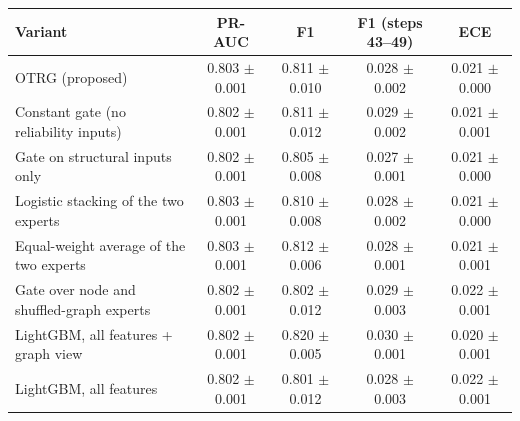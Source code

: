 \begin{tabular}{lcccc}
\toprule
Variant & PR-AUC & F1 & F1 (steps 43--49) & ECE \\
\midrule
OTRG (proposed) & 0.803 $\pm$ 0.001 & 0.811 $\pm$ 0.010 & 0.028 $\pm$ 0.002 & 0.021 $\pm$ 0.000 \\
Constant gate (no reliability inputs) & 0.802 $\pm$ 0.001 & 0.811 $\pm$ 0.012 & 0.029 $\pm$ 0.002 & 0.021 $\pm$ 0.001 \\
Gate on structural inputs only & 0.802 $\pm$ 0.001 & 0.805 $\pm$ 0.008 & 0.027 $\pm$ 0.001 & 0.021 $\pm$ 0.000 \\
Logistic stacking of the two experts & 0.803 $\pm$ 0.001 & 0.810 $\pm$ 0.008 & 0.028 $\pm$ 0.002 & 0.021 $\pm$ 0.000 \\
Equal-weight average of the two experts & 0.803 $\pm$ 0.001 & 0.812 $\pm$ 0.006 & 0.028 $\pm$ 0.001 & 0.021 $\pm$ 0.001 \\
Gate over node and shuffled-graph experts & 0.802 $\pm$ 0.001 & 0.802 $\pm$ 0.012 & 0.029 $\pm$ 0.003 & 0.022 $\pm$ 0.001 \\
LightGBM, all features + graph view & 0.802 $\pm$ 0.001 & 0.820 $\pm$ 0.005 & 0.030 $\pm$ 0.001 & 0.020 $\pm$ 0.001 \\
LightGBM, all features & 0.802 $\pm$ 0.001 & 0.801 $\pm$ 0.012 & 0.028 $\pm$ 0.003 & 0.022 $\pm$ 0.001 \\
\bottomrule
\end{tabular}
